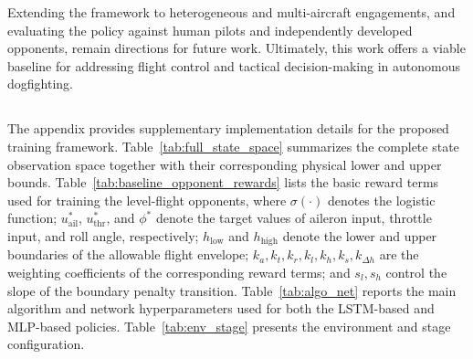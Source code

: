 \documentclass[pdflatex,sn-mathphys-num]{sn-jnl}%
\theoremstyle{thmstyleone}%
\theoremstyle{thmstyletwo}%
\theoremstyle{thmstylethree}%
\begin{document}
Extending the framework to heterogeneous and multi-aircraft engagements, and evaluating the policy against human pilots and independently developed opponents, remain directions for future work. Ultimately, this work offers a viable baseline for addressing flight control and tactical decision-making in autonomous dogfighting.

\begin{appendices}

\section{}

The appendix provides supplementary implementation details for the proposed training framework. Table~\ref{tab:full_state_space} summarizes the complete state observation space together with their corresponding physical lower and upper bounds. Table~\ref{tab:baseline_opponent_rewards} lists the basic reward terms used for training the level-flight opponents, where $\sigma(\cdot)$ denotes the logistic function; $u_{\mathrm{ail}}^\ast$, $u_{\mathrm{thr}}^\ast$, and $\phi^\ast$ denote the target values of aileron input, throttle input, and roll angle, respectively; $h_{\mathrm{low}}$ and $h_{\mathrm{high}}$ denote the lower and upper boundaries of the allowable flight envelope; $k_a,k_t,k_r,k_l,k_h,k_s,k_{\Delta h}$ are the weighting coefficients of the corresponding reward terms; and $s_l,s_h$ control the slope of the boundary penalty transition. Table~\ref{tab:algo_net} reports the main algorithm and network hyperparameters used for both the LSTM-based and MLP-based policies. Table~\ref{tab:env_stage} presents the environment and stage configuration.


\end{appendices}
\end{document}
